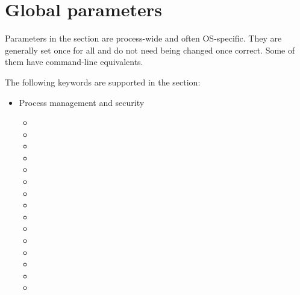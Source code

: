 
\chapter{Global parameters}

\hypertarget{keyword.global}{}%
Parameters in the  section are process-wide and often OS-specific. 
They are generally set once for all and do not need being changed once correct.
Some of them have command-line equivalents.

The following keywords are supported in the  section:

{\columnseprule 0.2pt
\begin{multicols}{2}
\begin{itemize}
\item Process management and security
	\begin{itemize}
	\item {}
	\item {}
	\item {}
	\item {}
	\item {}
	\item {}
	\item {}
	\item {}
	\item {}
	\item {}
	\item {}
	\item {}
	\item {}
	\item {}
	\item {}
	\end{itemize}


\end{itemize}
\end{multicols}}
